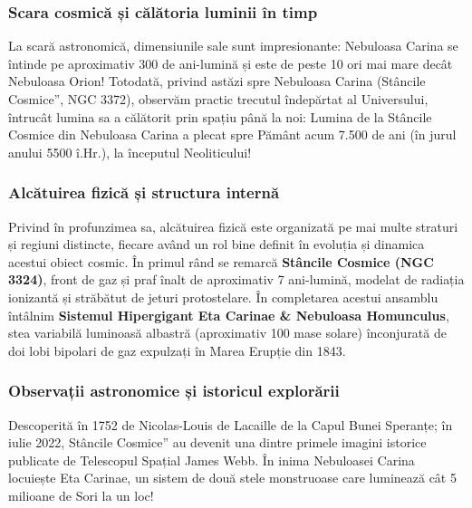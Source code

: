\subsubsection*{Scara cosmică și călătoria luminii în timp}
La scară astronomică, dimensiunile sale sunt impresionante: Nebuloasa Carina se întinde pe aproximativ 300 de ani-lumină și este de peste 10 ori mai mare decât Nebuloasa Orion! Totodată, privind astăzi spre Nebuloasa Carina (\quotedblbase{}Stâncile Cosmice\textquotedblright{}, NGC 3372), observăm practic trecutul îndepărtat al Universului, întrucât lumina sa a călătorit prin spațiu până la noi: Lumina de la Stâncile Cosmice din Nebuloasa Carina a plecat spre Pământ acum 7.500 de ani (în jurul anului 5500 î.Hr.), la începutul Neoliticului!

\subsubsection*{Alcătuirea fizică și structura internă}
Privind în profunzimea sa, alcătuirea fizică este organizată pe mai multe straturi și regiuni distincte, fiecare având un rol bine definit în evoluția și dinamica acestui obiect cosmic. În primul rând se remarcă \textbf{Stâncile Cosmice (NGC 3324)}, front de gaz și praf înalt de aproximativ 7 ani-lumină, modelat de radiația ionizantă și străbătut de jeturi protostelare. În completarea acestui ansamblu întâlnim \textbf{Sistemul Hipergigant Eta Carinae \& Nebuloasa Homunculus}, stea variabilă luminoasă albastră (aproximativ 100 mase solare) înconjurată de doi lobi bipolari de gaz expulzați în Marea Erupție din 1843.

\subsubsection*{Observații astronomice și istoricul explorării}
Descoperită în 1752 de Nicolas-Louis de Lacaille de la Capul Bunei Speranțe; în iulie 2022, \quotedblbase{}Stâncile Cosmice\textquotedblright{} au devenit una dintre primele imagini istorice publicate de Telescopul Spațial James Webb. În inima Nebuloasei Carina locuiește Eta Carinae, un sistem de două stele monstruoase care luminează cât 5 milioane de Sori la un loc!

